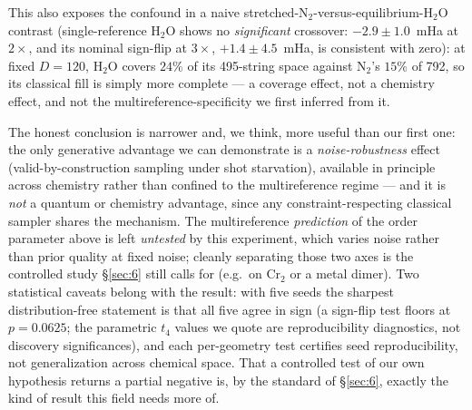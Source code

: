\documentclass[11pt]{article}
\begin{document}
This also exposes the confound in a naive stretched-N$_2$-versus-equilibrium-H$_2$O contrast (single-reference H$_2$O shows no \emph{significant} crossover: $-2.9\pm1.0$~mHa at $2\times$, and its nominal sign-flip at $3\times$, $+1.4\pm4.5$~mHa, is consistent with zero): at fixed $D{=}120$, H$_2$O covers $24\%$ of its 495-string space against N$_2$'s $15\%$ of 792, so its classical fill is simply more complete --- a coverage effect, not a chemistry effect, and not the multireference-specificity we first inferred from it.

The honest conclusion is narrower and, we think, more useful than our first one: the only generative advantage we can demonstrate is a \emph{noise-robustness} effect (valid-by-construction sampling under shot starvation), available in principle across chemistry rather than confined to the multireference regime --- and it is \emph{not} a quantum or chemistry advantage, since any constraint-respecting classical sampler shares the mechanism. The multireference \emph{prediction} of the order parameter above is left \emph{untested} by this experiment, which varies noise rather than prior quality at fixed noise; cleanly separating those two axes is the controlled study \S\ref{sec:6} still calls for (e.g.\ on Cr$_2$ or a metal dimer). Two statistical caveats belong with the result: with five seeds the sharpest distribution-free statement is that all five agree in sign (a sign-flip test floors at $p{=}0.0625$; the parametric $t_4$ values we quote are reproducibility diagnostics, not discovery significances), and each per-geometry test certifies seed reproducibility, not generalization across chemical space. That a controlled test of our own hypothesis returns a partial negative is, by the standard of \S\ref{sec:6}, exactly the kind of result this field needs more of.
\end{document}
